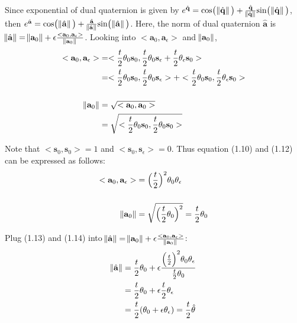 \documentclass[paper=a4, fontsize=11pt]{scrartcl} %
\numberwithin{equation}{section} %
\numberwithin{figure}{section} %
\numberwithin{table}{section} %
\renewcommand{\vec}[1]{\mathbf{#1}}
\begin{document}
\begin{itemize}
	Since exponential of dual quaternion is given by $e^{\hat{\vec{q}}} = \text{cos} \big( \norm{\hat{\vec{q}}} \big) + \frac{\hat{\vec{q}}}{\norm{\hat{\vec{q}}}} \text{sin} \big( \norm{\hat{\vec{q}}} \big)$, then $e^{\hat{\vec{a}}} = \text{cos} \big( \norm{\hat{\vec{a}}} \big) + \frac{\hat{\vec{a}}}{\norm{\hat{\vec{a}}}} \text{sin} \big( \norm{\hat{\vec{a}}} \big)$. Here, the norm of dual quaternion $\hat{\vec{a}}$ is $\norm{\hat{\vec{a}}} = \norm{\vec{a}_0} + \epsilon \frac{<\vec{a}_0, \vec{a}_\epsilon>}{\norm{\vec{a}_0}}$. Looking into $<\vec{a}_0, \vec{a}_\epsilon>$ and $\norm{\vec{a}_0}$,
	\begin{align}
		<\vec{a}_0, \vec{a}_\epsilon> &= <\frac{t}{2} \theta_0\vec{s}_0, \frac{t}{2} \theta_0 \vec{s}_\epsilon + \frac{t}{2} \theta_\epsilon \vec{s}_0> \\
		&= <\frac{t}{2} \theta_0\vec{s}_0, \frac{t}{2} \theta_0 \vec{s}_\epsilon> + <\frac{t}{2} \theta_0\vec{s}_0, \frac{t}{2} \theta_\epsilon \vec{s}_0> \\[0.5cm] 
		\norm{\vec{a}_0} &= \sqrt{<\vec{a}_0, \vec{a}_0>} \\
		&= \sqrt{<\frac{t}{2} \theta_0 \vec{s}_0, \frac{t}{2} \theta_0 \vec{s}_0>} 
	\end{align}
	
	Note that $<\vec{s}_0, \vec{s}_0> = 1$ and $<\vec{s}_0, \vec{s}_\epsilon> = 0$. Thus equation (1.10) and (1.12) can be expressed as follows: 
	\begin{align}
		<\vec{a}_0, \vec{a}_\epsilon> &= \Big(\frac{t}{2}\Big)^2 \theta_0 \theta_\epsilon \\[0.5cm]
		\norm{\vec{a}_0} &= \sqrt{\Big(\frac{t}{2} \theta_0 \Big)^2} = \frac{t}{2} \theta_0 
	\end{align}
	
	Plug (1.13) and (1.14) into $\norm{\hat{\vec{a}}} = \norm{\vec{a}_0} + \epsilon \frac{<\vec{a}_0, \vec{a}_\epsilon>}{\norm{\vec{a}_0}}$:
	\begin{align}
		\norm{\hat{\vec{a}}} &= \frac{t}{2} \theta_0 + \epsilon \frac{\Big(\frac{t}{2}\Big)^2 \theta_0 \theta_\epsilon}{\frac{t}{2} \theta_0}	\\
		&= \frac{t}{2} \theta_0 + \epsilon \frac{t}{2} \theta_\epsilon \\
		&= \frac{t}{2} (\theta_0 + \epsilon \theta_\epsilon) = \frac{t}{2} \hat{\theta}
	\end{align}
	

\end{itemize}
\end{document}
